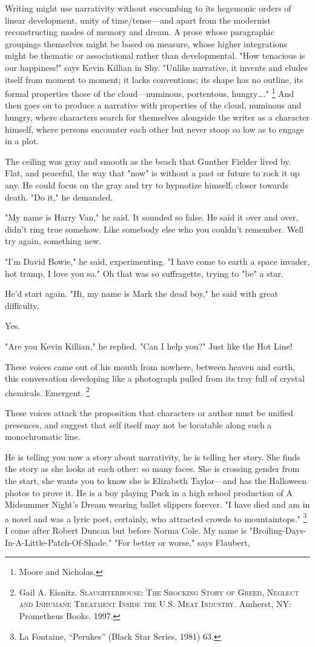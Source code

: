\documentclass[
]{memoir}
\begin{document}
Writing might use narrativity without succumbing to its hegemonic orders
of linear development, unity of time/tense---and apart from the
modernist reconstructing modes of memory and dream. A prose whose
paragraphic groupings themselves might be based on measure, whose higher
integrations might be thematic or associational rather than
developmental. "How tenacious is our happiness!" says Kevin Killian in
Shy. "Unlike narrative, it invents and eludes itself from moment to
moment; it lacks conventions; its shape has no outline, its formal
properties those of the cloud---numinous, portentous, hungry\ldots{}."
\footnote{Moore and Nicholas.} And then goes on to produce a narrative
with properties of the cloud, numinous and hungry, where characters
search for themselves alongside the writer as a character himself, where
persons encounter each other but never stoop so low as to engage in a
plot.

The ceiling was gray and smooth as the beach that Gunther Fielder lived
by. Flat, and peaceful, the way that "now" is without a past or future
to rock it up any. He could focus on the gray and try to hypnotize
himself, closer towards death. "Do it," he demanded.

"My name is Harry Van," he said. It sounded so false. He said it over
and over, didn't ring true somehow. Like somebody else who you couldn't
remember. Well try again, something new.

"I'm David Bowie," he said, experimenting. "I have come to earth a space
invader, hot tramp, I love you so." Oh that was so suffragette, trying
to "be" a star.

He'd start again. "Hi, my name is Mark the dead boy," he said with great
difficulty.

Yes.

"Are you Kevin Killian," he replied. "Can I help you?" Just like the Hot
Line!

These voices came out of his mouth from nowhere, between heaven and
earth, this conversation developing like a photograph pulled from its
tray full of crystal chemicals. Emergent. \footnote{Gail A. Eisnitz.
  \textsc{Slaughterhouse: The Shocking Story of Greed, Neglect and
  Inhumane Treatment Inside the U.S. Meat Industry}. Amherst, NY:
  Prometheus Books. 1997.}

These voices attack the proposition that characters or author must be
unified presences, and suggest that self itself may not be locatable
along such a monochromatic line.

He is telling you now a story about narrativity, he is telling her
story. She finds the story as she looks at each other: so many faces.
She is crossing gender from the start, she wants you to know she is
Elizabeth Taylor---and has the Halloween photos to prove it. He is a boy
playing Puck in a high school production of A Midsummer Night's Dream
wearing ballet slippers forever. "I have died and am in a novel and was
a lyric poet, certainly, who attracted crowds to mountaintops."
\footnote{La Fontaine, ``Perukes'' (Black Star Series, 1981) 63.} I come
after Robert Duncan but before Norma Cole. My name is
"Broiling-Days-In-A-Little-Patch-Of-Shade." "For better or worse," says
Flaubert,
\end{document}
